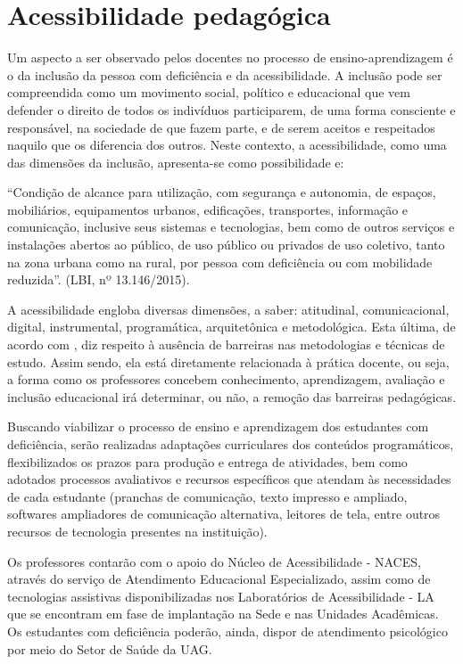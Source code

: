 \documentclass[
	12pt,				%
	openright,			%
  oneside,     %
	a4paper,			%
 hyphens,
	chapter=TITLE,		%
	english,			%
	french,				%
	spanish,			%
	brazil				%
	]{abntex2}
\begin{document}
\section{Acessibilidade pedagógica}

Um aspecto a ser observado pelos docentes no processo de ensino-aprendizagem é o da inclusão da pessoa com deficiência e da acessibilidade. A inclusão pode ser compreendida como um movimento social, político e educacional que vem defender o direito de todos os indivíduos participarem, de uma forma consciente e responsável, na sociedade de que fazem parte, e de serem aceitos e respeitados naquilo que os diferencia dos outros. Neste contexto, a acessibilidade, como uma das dimensões da inclusão, apresenta-se como possibilidade e:

\begin{citacao}
    “Condição de alcance para utilização, com segurança e autonomia, de espaços, mobiliários, equipamentos urbanos, edificações, transportes, informação e comunicação, inclusive seus sistemas e tecnologias, bem como de outros serviços e instalações abertos ao público, de uso público ou privados de uso coletivo, tanto na zona urbana como na rural, por pessoa com deficiência ou com mobilidade reduzida”. (LBI, nº 13.146/2015).
\end{citacao}

A acessibilidade engloba diversas dimensões, a saber: atitudinal, comunicacional, digital, instrumental, programática, arquitetônica e metodológica. Esta última, de acordo com , diz respeito à ausência de barreiras nas metodologias e técnicas de estudo. Assim sendo, ela está diretamente relacionada à prática docente, ou seja, a forma como os professores concebem conhecimento, aprendizagem, avaliação e inclusão educacional irá determinar, ou não, a remoção das barreiras pedagógicas.

Buscando viabilizar o processo de ensino e aprendizagem dos estudantes com deficiência, serão realizadas adaptações curriculares dos conteúdos programáticos, flexibilizados os prazos para produção e entrega de atividades, bem como adotados processos avaliativos e recursos específicos que atendam às necessidades de cada estudante (pranchas de comunicação, texto impresso e ampliado, softwares ampliadores de comunicação alternativa, leitores de tela, entre outros recursos de tecnologia presentes na instituição).

Os professores contarão com o apoio do Núcleo de Acessibilidade - NACES, através do serviço de Atendimento Educacional Especializado, assim como de tecnologias assistivas disponibilizadas nos Laboratórios de Acessibilidade - LA que se encontram em fase de implantação na Sede e nas Unidades Acadêmicas. Os estudantes com deficiência poderão, ainda, dispor de atendimento psicológico por meio do Setor de Saúde da UAG.
\end{document}
